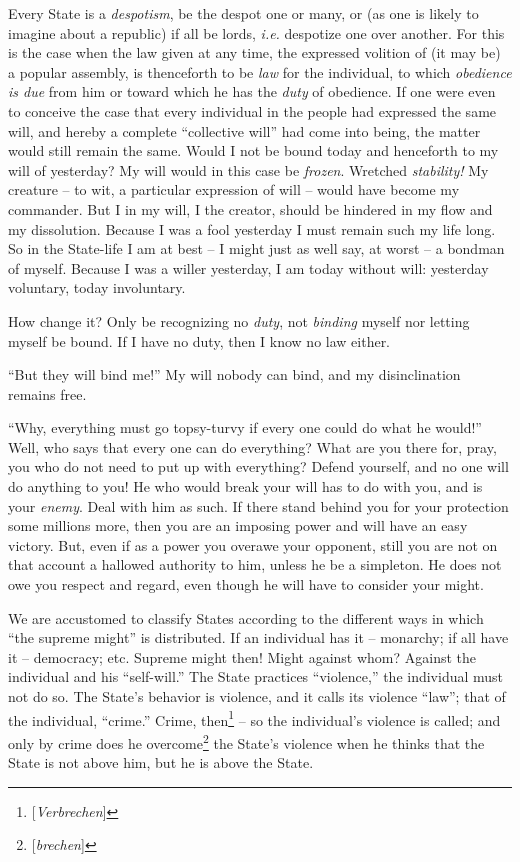 \documentclass[12pt,a4paper]{book}
\begin{document}
Every State is a \textit{despotism}, be the despot one or many, or (as one is 
likely to imagine about a republic) if all be lords, \textit{i.e.} despotize 
one over another. For this is the case when the law given at any time, the 
expressed volition of (it may be) a popular assembly, is thenceforth to be 
\textit{law} for the individual, to which \textit{obedience is due} from him 
or toward which he has the \textit{duty} of obedience. If one were even to 
conceive the case that every individual in the people had expressed the same 
will, and hereby a complete ``collective will'' had come into being, the 
matter would still remain the same. Would I not be bound today and henceforth 
to my will of yesterday? My will would in this case be \textit{frozen}. 
Wretched \textit{stability!} My creature -- to wit, a particular expression of 
will -- would have become my commander. But I in my will, I the creator, 
should be hindered in my flow and my dissolution. Because I was a fool 
yesterday I must remain such my life long. So in the State-life I am at best 
-- I might just as well say, at worst -- a bondman of myself. Because I was a 
willer yesterday, I am today without will: yesterday voluntary, today 
involuntary.

How change it? Only be recognizing no \textit{duty}, not \textit{binding} 
myself nor letting myself be bound. If I have no duty, then I know no law 
either.

``But they will bind me!'' My will nobody can bind, and my disinclination 
remains free.

``Why, everything must go topsy-turvy if every one could do what he would!'' 
Well, who says that every one can do everything? What are you there for, pray, 
you who do not need to put up with everything? Defend yourself, and no one 
will do anything to you! He who would break your will has to do with you, and 
is your \textit{enemy}. Deal with him as such. If there stand behind you for 
your protection some millions more, then you are an imposing power and will 
have an easy victory. But, even if as a power you overawe your opponent, still 
you are not on that account a hallowed authority to him, unless he be a 
simpleton. He does not owe you respect and regard, even though he will have to 
consider your might.

We are accustomed to classify States according to the different ways in which 
``the supreme might'' is distributed. If an individual has it -- monarchy; 
if all have it -- democracy; etc. Supreme might then! Might against whom? 
Against the individual and his ``self-will.'' The State practices 
``violence,'' the individual must not do so. The State's behavior is 
violence, and it calls its violence ``law''; that of the individual, 
``crime.'' Crime, then\footnote{[\textit{Verbrechen}]} -- so the 
individual's violence is called; and only by crime does he 
overcome\footnote{[\textit{brechen}]} the State's violence when he thinks that 
the State is not above him, but he is above the State.
\end{document}
